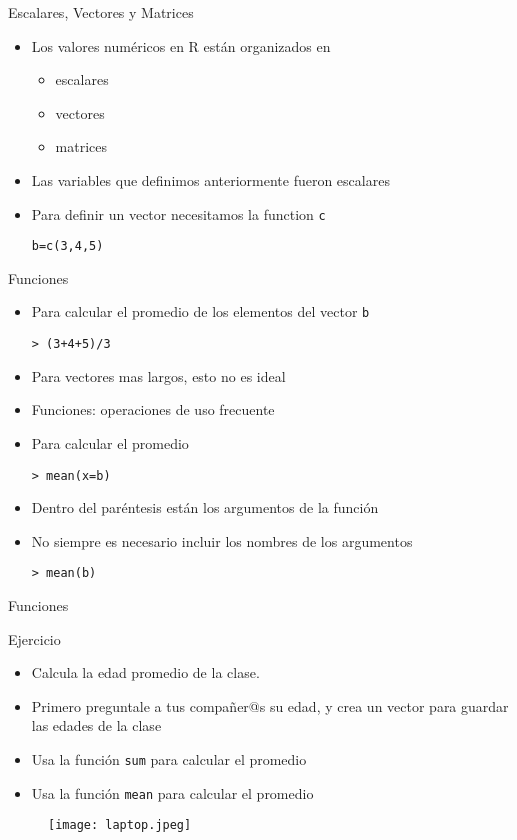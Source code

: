 \documentclass{beamer}
\begin{document}
\begin{frame}[fragile]{Escalares, Vectores y Matrices}
\begin{itemize}
\item Los valores numéricos en R están organizados en 
\begin{itemize}
\item escalares 
\item vectores
\item matrices
\end{itemize}
\item Las variables que definimos anteriormente fueron escalares
\item Para definir un vector necesitamos la function \verb=c=
\begin{verbatim}
b=c(3,4,5)
\end{verbatim}
\end{itemize}
\end{frame}

\begin{frame}[fragile]{Funciones}
\begin{itemize}
\item Para calcular el promedio de los elementos del vector \verb=b=
\begin{verbatim}
> (3+4+5)/3
\end{verbatim}
\item Para vectores mas largos, esto no es ideal
\item Funciones: operaciones de uso frecuente 
\item Para calcular el promedio
\begin{verbatim}
> mean(x=b)
\end{verbatim}
\item Dentro del paréntesis están los argumentos de la función
\item No siempre es necesario incluir los nombres de los argumentos
\begin{verbatim}
> mean(b)
\end{verbatim}
\end{itemize}
\end{frame}

\begin{frame}[fragile]{Funciones}
\begin{block}{Ejercicio}
\begin{itemize}
\item Calcula la edad promedio de la clase.
\item Primero preguntale a tus compañer@s su edad, y crea un vector para guardar las edades de la clase
\item Usa la función \verb=sum= para calcular el promedio
\item Usa la función \verb=mean= para calcular el promedio
\end{itemize}
\end{block}
\begin{figure}[H]
\centering
\texttt{[image: laptop.jpeg]}
\end{figure}
\end{frame}
\end{document}
